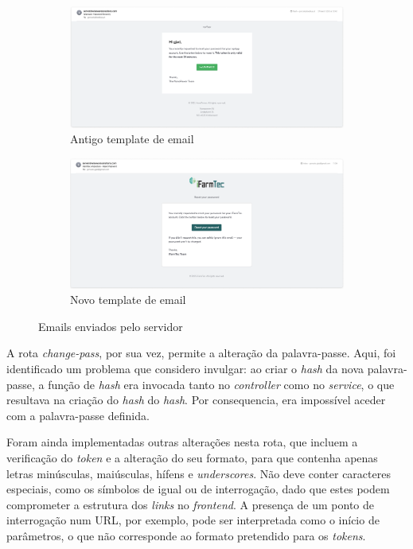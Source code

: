 \begin{figure}[!h]
	\centering
	\begin{subfigure}[c]{0.45\textwidth}
		\centering
		\includegraphics[width=\textwidth]{figs/oldEmail.png}
		\caption{Antigo template de email}
		\label{fig:oldEmail}
	\end{subfigure}
	\hfill
	\begin{subfigure}[c]{0.45\textwidth}
		\centering
		\includegraphics[width=\textwidth]{figs/email.png}
		\caption{Novo template de email}
		\label{fig:newEmail} 
	\end{subfigure}
	\caption{Emails enviados pelo servidor}
\end{figure}


A rota \textit{change-pass}, por sua vez, permite a alteração da palavra-passe. Aqui, foi identificado um problema que considero invulgar: ao criar o \textit{hash} da nova palavra-passe, a função de \textit{hash} era invocada tanto no \textit{controller} como no \textit{service}, o que resultava na criação do \textit{hash} do \textit{hash}. Por consequencia, era impossível aceder com a palavra-passe definida.

Foram ainda implementadas outras alterações nesta rota, que incluem a verificação do \textit{token} e a alteração do seu formato, para que contenha apenas letras minúsculas, maiúsculas, hífens e \textit{underscores}. Não deve conter caracteres especiais, como os símbolos de igual ou de interrogação, dado que estes podem comprometer a estrutura dos \textit{links} no \textit{frontend}. A presença de um ponto de interrogação num URL, por exemplo, pode ser interpretada como o início de parâmetros, o que não corresponde ao formato pretendido para os \textit{tokens}.

